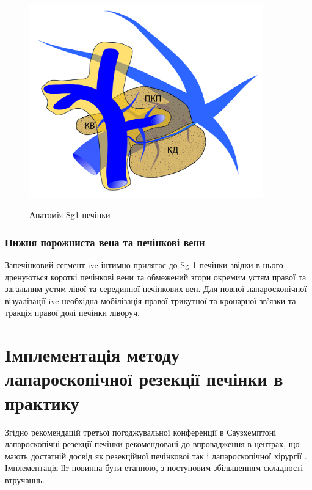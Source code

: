 \begin{refsection}
\begin{figure}[h]
\caption{Анатомія Sg1 печінки}
\centering
\includegraphics[width=0.9\textwidth]{Illustrations/Chapter_01/Sg1.jpg}
\label{fig:Sg1}
\end{figure}

\subsubsection{Нижня порожниста вена та печінкові вени}

Запечінковий сегмент \acrshort{ivc} інтимно прилягає до Sg 1 печінки звідки в нього дренуються короткі печінкові вени та обмежений згори окремим устям правої та загальним устям лівої та серединної печінкових вен. Для повної лапароскопічної візуалізації \acrshort{ivc} необхідна мобілізація правої трикутної та кронарної зв'язки та тракція правої долі печінки ліворуч.

\section{Імплементація методу лапароскопічної резекції печінки в практику}

Згідно рекомендацій третьої погоджувальної конференції в Саузхемптоні лапароскопічні резекції печінки рекомендовані до впровадження в центрах, що мають достатній досвід як резекційної печінкової так і лапароскопічної хірургії \cite{AbuHilal2017a}. Імплементація \acrshort{llr} повинна бути етапною, з поступовим збільшенням складності втручаннь. 


\end{refsection}
